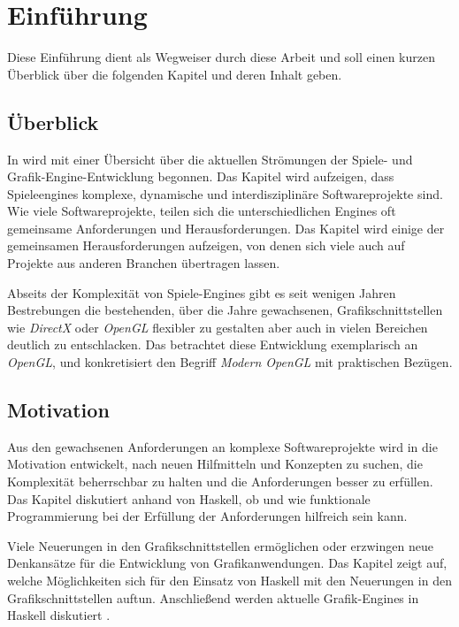 \chapter{Einführung}

Diese Einführung dient als Wegweiser durch diese Arbeit und soll einen kurzen Überblick über die folgenden Kapitel und deren Inhalt geben.

\section{Überblick}

In  wird mit einer Übersicht über die aktuellen Strömungen der Spiele- und Grafik-Engine-Entwicklung begonnen. Das Kapitel wird aufzeigen, dass Spieleengines komplexe, dynamische und interdisziplinäre Softwareprojekte sind. Wie viele Softwareprojekte, teilen sich die unterschiedlichen Engines oft gemeinsame Anforderungen und Herausforderungen. Das Kapitel wird einige der gemeinsamen Herausforderungen aufzeigen, von denen sich viele auch auf Projekte aus anderen Branchen übertragen lassen.

Abseits der Komplexität von Spiele-Engines gibt es seit wenigen Jahren Bestrebungen die bestehenden, über die Jahre gewachsenen, Grafikschnittstellen wie \textit{DirectX} oder \textit{OpenGL} flexibler zu gestalten aber auch in vielen Bereichen deutlich zu entschlacken. Das  betrachtet diese Entwicklung exemplarisch an \textit{OpenGL}, und konkretisiert den Begriff \textit{Modern OpenGL} mit praktischen Bezügen.

\section{Motivation}

Aus den gewachsenen Anforderungen an komplexe Softwareprojekte wird in  die Motivation entwickelt, nach neuen Hilfmitteln und Konzepten zu suchen, die Komplexität beherrschbar zu halten und die Anforderungen besser zu erfüllen. Das Kapitel diskutiert anhand von Haskell, ob und wie funktionale Programmierung bei der Erfüllung der Anforderungen hilfreich sein kann. 

Viele Neuerungen in den Grafikschnittstellen ermöglichen oder erzwingen neue Denkansätze für die Entwicklung von Grafikanwendungen. Das Kapitel zeigt auf, welche Möglichkeiten sich für den Einsatz von Haskell mit den Neuerungen in den Grafikschnittstellen auftun. Anschließend werden aktuelle Grafik-Engines in Haskell diskutiert .

